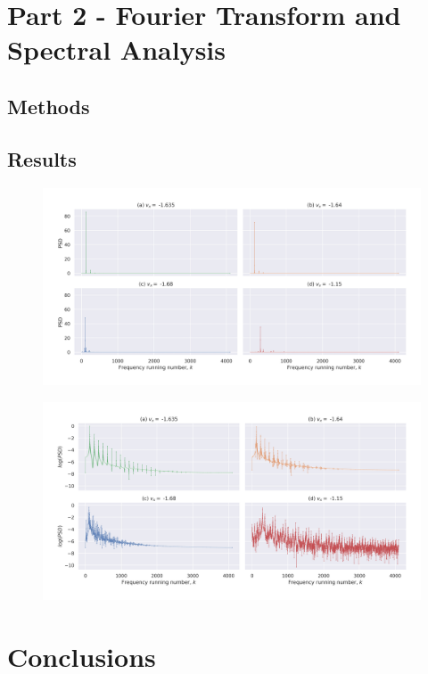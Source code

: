 \documentclass[a4paper]{article}
\begin{document}
	\section{Part 2 - Fourier Transform and Spectral Analysis} \label{task2}
	
	
		\subsection{Methods} \label{methods2}
	
		
		\subsection{Results} \label{results2}
		
		\begin{figure} [h]
			\includegraphics[width=\columnwidth]{../task2/plots/q1-5_lin.jpg}
			\caption{}
			\label{fig:task2_lin}
		\end{figure}
		
		\begin{figure} [h]
			\includegraphics[width=\columnwidth]{../task2/plots/q1-5_log.jpg}
		\end{figure}
	
	
	
	\section{Conclusions} \label{conclusions}
	
	
\end{document}
